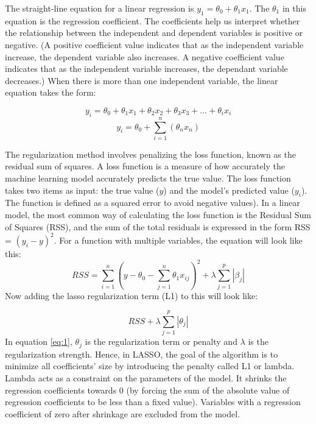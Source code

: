 The straight-line equation for a linear regression is $y_1 = \theta_0 + \theta_1x_1$. The $\theta_1$ in this equation is the regression coefficient. The coefficients help us interpret whether the relationship between the independent and dependent variables is positive or negative. (A positive coefficient value indicates that as the independent variable increase, the dependent variable also increases. A negative coefficient value indicates that as the independent variable increases, the dependant variable decreases.) When there is more than one independent variable, the linear equation takes the form: 

\begin{equation*}
    y_i = \theta_0 + \theta_1 x_1 + \theta_2 x_2 + \theta_3 x_3 + ... + \theta_i x_i
 \end{equation*}   
 \begin{equation}
    y_i = \theta_0 + \sum_{i=1}^{n}(\theta_n x_n)
\end{equation}

The regularization method involves penalizing the loss function, known as the residual sum of squares. A loss function is a measure of how accurately the machine learning model accurately predicts the true value. The loss function takes two items as input: the true value ($y$) and the model’s predicted value ($y_i$). The function is defined as a squared error to avoid negative values). In a linear model, the most common way of calculating the loss function is the Residual Sum of Squares (RSS), and the sum of the total residuals is expressed in the form RSS = $(y_i - y)^2$. For a function with multiple variables, the equation will look like this:
\begin{equation*} \label{eq:1}
   RSS = \sum_{i=1}^{n}(y - \theta_0 - \sum_{j=1}^{n}\theta_1x_{ij})^2 + \lambda\sum_{j=1}^{p}|\beta_{j}|
\end{equation*}
Now adding the lasso regularization term (L1) to this will look like:

\begin{equation} \label{eq:1}
    RSS + \lambda\sum_{j=1}^{p}|\theta_{j}|
\end{equation}
In equation \ref{eq:1}, $\theta_j$ is the regularization term or penalty and $\lambda$ is the regularization strength. Hence, in LASSO, the goal of the algorithm is to minimize all coefficients' size by introducing the penalty called L1 or lambda. Lambda acts as a constraint on the parameters of the model. It shrinks the regression coefficients towards 0 (by forcing the sum of the absolute value of regression coefficients to be less than a fixed value). Variables with a regression coefficient of zero after shrinkage are excluded from the model. 

